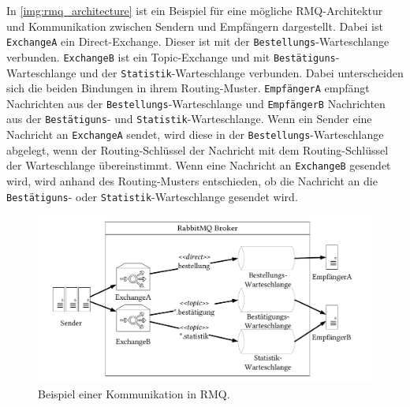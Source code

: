 In \autoref{img:rmq_architecture} ist ein Beispiel für eine mögliche RMQ-Architektur und Kommunikation zwischen Sendern und Empfängern dargestellt. Dabei ist \texttt{ExchangeA} ein Direct-Exchange. Dieser ist mit der \texttt{Bestellungs}-Warteschlange verbunden. \texttt{ExchangeB} ist ein Topic-Exchange und mit \texttt{Bestätiguns}-Warteschlange und der \texttt{Statistik}-Warteschlange verbunden. Dabei unterscheiden sich die beiden Bindungen in ihrem Routing-Muster. \texttt{EmpfängerA} empfängt Nachrichten aus der \texttt{Bestellungs}-Warteschlange und \texttt{EmpfängerB} Nachrichten aus der \texttt{Bestätiguns}- und \texttt{Statistik}-Warteschlange. Wenn ein Sender eine Nachricht an \texttt{ExchangeA} sendet, wird diese in der \texttt{Bestellungs}-Warteschlange abgelegt, wenn der Routing-Schlüssel der Nachricht mit dem Routing-Schlüssel der Warteschlange übereinstimmt. Wenn eine Nachricht an \texttt{ExchangeB} gesendet wird, wird anhand des Routing-Musters entschieden, ob die Nachricht an die \texttt{Bestätiguns}- oder \texttt{Statistik}-Warteschlange gesendet wird. 
\begin{figure}
\center
  \includegraphics[width=1\textwidth]{images/measurement/rmqexample.pdf}
  \caption{Beispiel einer Kommunikation in RMQ.}
  \label{img:rmq_architecture}
\end{figure}

